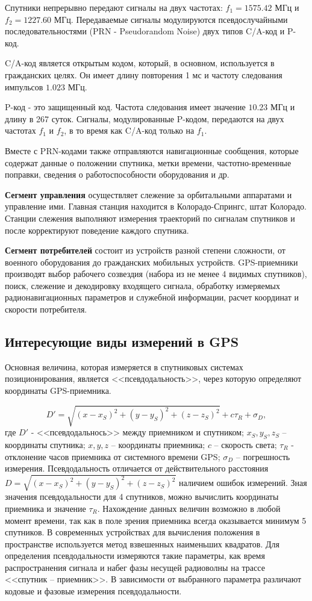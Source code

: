 \documentclass[14pt]{article}
\begin{document}
Спутники непрерывно передают сигналы на двух частотах: $f_1 = 1575.42 \text{ МГц}$ и $f_2 = 1227.60 \text{ МГц}$. Передаваемые сигналы модулируются псевдослучайными последовательностями (PRN - Pseudorandom Noise) двух типов C/A-код и P-код.

C/A-код является открытым кодом, который, в основном, используется в гражданских целях. Он имеет длину повторения 1 мс и частоту следования импульсов $1.023 \text{ МГц}$.

P-код - это защищенный код. Частота следования имеет значение $10.23 \text{ МГц}$ и длину в 267 суток. Сигналы, модулированные P-кодом, передаются на двух частотах $f_1$ и $f_2$, в то время как C/A-код только на $f_1$.

Вместе с PRN-кодами также отправляются навигационные сообщения, которые содержат данные о положении спутника, метки времени, частотно-временные поправки, сведения о работоспособности оборудования и др.

\textbf{Сегмент управления} осуществляет слежение за орбитальными аппаратами и управление ими. Главная станция находится в Колорадо-Спрингс, штат Колорадо. Станции слежения выполняют измерения траекторий по сигналам спутников и после корректируют поведение каждого спутника.

\textbf{Сегмент потребителей} состоит из устройств разной степени сложности, от военного оборудования до гражданских мобильных устройств. GPS-приемники производят выбор рабочего созвездия (набора из не менее 4 видимых спутников), поиск, слежение и декодировку входящего сигнала, обработку измеряемых радионавигационных параметров и служебной информации, расчет координат и скорости потребителя.

\subsection{Интересующие виды измерений в GPS}
Основная величина, которая измеряется в спутниковых системах позиционирования, является <<псевдодальность>>, через которую определяют координаты GPS-приемника.

\begin{equation}
D' = \sqrt{(x - x_S)^2 + (y - y_S)^2 + (z - z_S)^2} + c\tau_R +\sigma_D,
\end{equation}
где $D'$ - <<псевдодальнось>> между приемником и спутником; $x_S, y_S, z_S$ -- координаты спутника; $x, y, z$ -- координаты приемника; $c$ -- скорость света; $\tau_R$ - отклонение часов приемника от системного времени GPS; $\sigma_D$ -- погрешность измерения. 
Псевдодальность отличается от действительного расстояния $D = \sqrt{(x - x_S) ^ 2 + (y - y_S) ^ 2 + (z - z_S) ^ 2}$ наличием ошибок измерений. 
Зная значения псевдодальности для 4 спутников, можно вычислить координаты приемника и значение $\tau_R$. Нахождение данных величин возможно в любой момент времени, так как в поле зрения приемника всегда оказывается минимум 5 спутников. В современных устройствах для вычисления положения в пространстве используется метод взвешенных наименьших квадратов. Для определения псевдодальности измеряются такие параметры, как время распространения сигнала и набег фазы несущей радиоволны на трассе <<спутник -- приемник>>. В зависимости от выбранного параметра различают кодовые и фазовые измерения псевдодальности.
\end{document}
